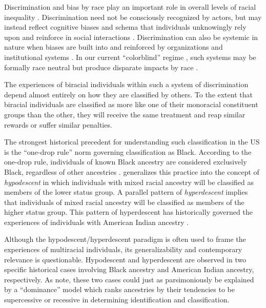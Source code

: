 \documentclass[
  12pt,
  letterpaper,
]{article}
\begin{document}
Discrimination and bias by race play an important role in overall levels
of racial inequality \autocite{quillian_new_2006,pager_sociology_2008}.
Discrimination need not be consciously recognized by actors, but may
instead reflect cognitive biases and schema that individuals unknowingly
rely upon and reinforce in social interactions
\autocite{quillian_new_2006}. Discrimination can also be systemic in
nature when biases are built into and reinforced by organizations and
institutional systems \autocite{reskin_race_2012}. In our current
``colorblind'' regime \autocite{bonilla-silva_racism_2006}, such systems
may be formally race neutral but produce disparate impacts by race
\autocite{pager_sociology_2008}.

The experiences of biracial individuals within such a system of
discrimination depend almost entirely on how they are classified by
others. To the extent that biracial individuals are classified as more
like one of their monoracial constituent groups than the other, they
will receive the same treatment and reap similar rewards or suffer
similar penalties.

The strongest historical precedent for understanding such classification
in the US is the ``one-drop rule'' norm governing classification as
Black. According to the one-drop rule, individuals of known Black
ancestry are considered exclusively Black, regardless of other
ancestries \autocite{davis_who_1991}. \textcite{davis_who_1991}
generalizes this practice into the concept of \emph{hypodescent} in
which individuals with mixed racial ancestry will be classified as
members of the lower status group. A parallel pattern of
\emph{hyperdescent} implies that individuals of mixed racial ancestry
will be classified as members of the higher status group. This pattern
of hyperdescent has historically governed the experiences of individuals
with American Indian ancestry
\autocite{snipp_american_1989,wolfe_land_2001}.

Although the hypodescent/hyperdescent paradigm is often used to frame
the experiences of multiracial individuals, its generalizability and
contemporary relevance is questionable. Hypodescent and hyperdescent are
observed in two specific historical cases involving Black ancestry and
American Indian ancestry, respectively. As
\textcite{iverson_regimes_2022} note, these two cases could just as
parsimoniously be explained by a ``dominance'' model which ranks
ancestries by their tendencies to be supercessive or recessive in
determining identification and classification.
\end{document}

